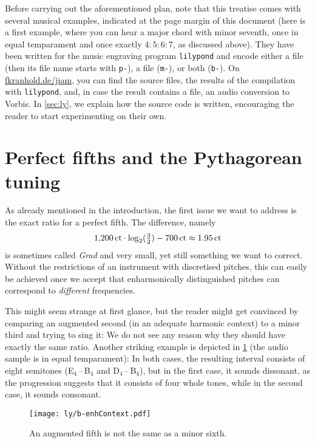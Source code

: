 \documentclass[british,11pt]{scrartcl}
\begin{document}
Before carrying out the aforementioned plan, note that this treatise comes with
several musical examples, indicated at the page margin of this document
 (here is a first example, where you can hear a major chord with
minor seventh, once in equal temparament and once exactly $4:5:6:7$, as
discussed above).  They have been written for the music engraving program
\verb!lilypond! and encode either a  file (then its file name starts
with \verb!p-!), a  file (\verb!m-!), or both (\verb!b-!).  On
\href{https://fkranhold.de/jiam/}{\textsf{fkranhold.de/jiam}}, you can find the
source files, the results of the compilation with \verb!lilypond!, and, in case
the result contains a  file, an audio conversion to 
Vorbis. In \cref{sec:ly}, we explain how the source code is written, encouraging
the reader to start experimenting on their own.

\section{Perfect fifths and the Pythagorean tuning}

As already mentioned in the introduction, the first issue we want to address is
the exact ratio for a perfect fifth. The difference, namely
\[1{,}200\,\mathrm{ct}\cdot \log_2(\tfrac32) - 700\,\mathrm{ct} \approx 1.95\,\mathrm{ct}\]%
is sometimes called \emph{Grad} and very small, yet still something we want to
correct.  Without the restrictions of an instrument with discretised pitches,
this can easily be achieved once we accept that enharmonically distinguished
pitches can correspond to \emph{different} frequencies.

This might seem strange at first glance, but the reader might get convinced by
comparing an augmented second (in an adequate harmonic context) to a minor third
and trying to sing it: We do not see any reason why they should have exactly the
same ratio. Another striking example is depicted in \cref{fig:enhContext} (the
audio sample is in equal temparament): In both cases, the resulting interval
consists of eight semitones (\flat E$_4$\,–\,B$_4$ and \sharp D$_4$\,–\,B$_4$),
but in the first case, it sounds dissonant, as the progression suggests that it
consists of four whole tones, while in the second case, it sounds consonant.

\begin{figure}[h]
  \centering
  \texttt{[image: ly/b-enhContext.pdf]}
  \caption{An augmented fifth is not the same as a minor
    sixth.}\label{fig:enhContext}
\end{figure}
\end{document}
